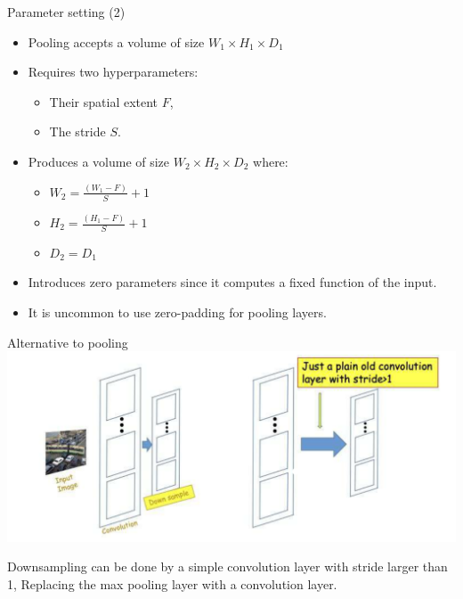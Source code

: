 \documentclass[default, aspectratio=169]{beamer}
\begin{document}
	\begin{frame}{Parameter setting (2)}
		\begin{itemize}
			\item Pooling accepts a volume of size $W_1 \times H_1 \times D_1$
			\item Requires two hyperparameters:
			\begin{itemize}
				\item Their spatial extent $F$,
				\item The stride $S$.
			\end{itemize}
			\item Produces a volume of size $W_2 \times H_2 \times D_2$ where:
			\begin{itemize}
				\item $W_2 = \frac{(W_1 - F)}{S} + 1$
				\item $H_2 = \frac{(H_1 - F)}{S} + 1$
				\item $D_2 = D_1$
			\end{itemize}
			\item Introduces zero parameters since it computes a fixed function of the input.
			\item It is uncommon to use zero-padding for pooling layers.
		\end{itemize}
	\end{frame}
	\begin{frame}{Alternative to pooling}
		\centering
		\includegraphics[keepaspectratio, scale=0.55]{pic/pooling3.png}
		\smallskip
		\begin{flushleft}
			Downsampling can be done by a simple convolution layer with stride larger than 1, Replacing the max pooling layer with a convolution layer.
		\end{flushleft}
	\end{frame}
\end{document}
